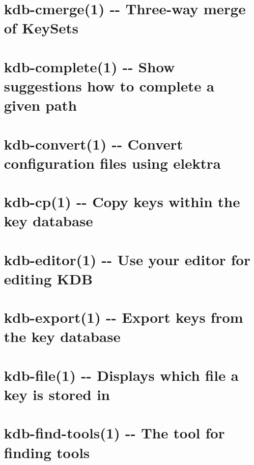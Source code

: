 \documentclass[twoside]{book}
\newcommand{\+}{\discretionary{\mbox{\scriptsize$\hookleftarrow$}}{}{}}
\begin{document}
\chapter{kdb-\/cmerge(1) -\/-\/ Three-\/way merge of Key\+Sets}
\label{doc_help_kdb-cmerge_md}

\chapter{kdb-\/complete(1) -\/-\/ Show suggestions how to complete a given path}
\label{doc_help_kdb-complete_md}

\chapter{kdb-\/convert(1) -\/-\/ Convert configuration files using elektra}
\label{doc_help_kdb-convert_md}

\chapter{kdb-\/cp(1) -\/-\/ Copy keys within the key database}
\label{doc_help_kdb-cp_md}

\chapter{kdb-\/editor(1) -\/-\/ Use your editor for editing K\+DB}
\label{doc_help_kdb-editor_md}

\chapter{kdb-\/export(1) -\/-\/ Export keys from the key database}
\label{doc_help_kdb-export_md}

\chapter{kdb-\/file(1) -\/-\/ Displays which file a key is stored in}
\label{doc_help_kdb-file_md}

\chapter{kdb-\/find-\/tools(1) -\/-\/ The tool for finding tools}
\label{doc_help_kdb-find-tools_md}

\end{document}
